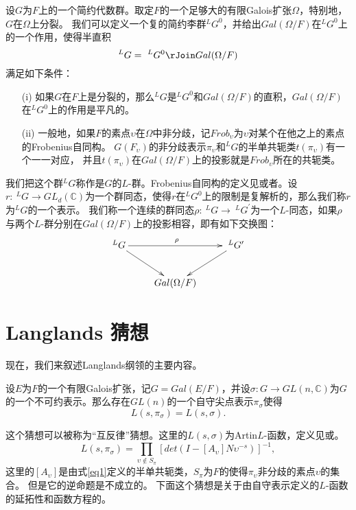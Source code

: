   设$G$为$F$上的一个简约代数群。取定$F$的一个足够大的有限Galois扩张$\Omega$，特别地，$G$在$\Omega$上分裂。
  我们可以定义一个复的简约李群$^LG^0$，并给出$Gal(\Omega/F)$在$^LG^0$上的一个作用，使得半直积
  $$^LG = \ ^LG^0\rJoin Gal(\Omega/F)$$
  满足如下条件：
  \begin{enumerate}
  \item[(i)]如果$G$在$F$上是分裂的，那么$^LG$是$^LG^0$和$Gal(\Omega/F)$的直积，$Gal(\Omega/F)$在$^LG^0$上的作用是平凡的。
  \item[(ii)]一般地，如果$F$的素点$\upsilon$在$\Omega$中非分歧，记$Frob_{\upsilon}$为$\upsilon$对某个在他之上的素点的Frobenius自同构。
  $G(F_{\upsilon})$的非分歧表示$\pi_{\upsilon}$和$^LG$的半单共轭类$t(\pi_{\upsilon})$有一个一一对应，
  并且$t(\pi_{\upsilon})$在$Gal(\Omega/F)$上的投影就是$Frob_{\upsilon}$所在的共轭类。
  \end{enumerate}

  我们把这个群$^LG$称作是$G$的$L$-群。Frobenius自同构的定义见或者。设$r:\ ^LG\rightarrow
  GL_d(\mathbb{C})$为一个群同态，使得$r$在$^LG^0$上的限制是复解析的，那么我们称$r$为$^LG$的一个表示。
  我们称一个连续的群同态$\rho:\ ^LG\rightarrow \
  ^LG^{\prime}$为一个$L$-同态，如果$\rho$与两个$L$-群分别在$Gal(\Omega/F)$上的投影相容，即有如下交换图：
  \[ \xymatrix{
  ^LG \ar[rr]^{\rho} \ar[dr] & & \ ^LG^{\prime} \ar[dl] \\
  & Gal(\Omega/F) & }  \]

\section{Langlands 猜想}
  现在，我们来叙述Langlands纲领的主要内容。
  \begin{conjecture}
  \label{cong1}
  设$E$为$F$的一个有限Galois扩张，记$G = Gal(E/F)$，并设$\sigma:
  G\rightarrow
  GL(n,\mathbb{C})$为$G$的一个不可约表示。那么存在$GL(n)$的一个自守尖点表示$\pi_{\sigma}$使得
  $$L(s,\pi_{\sigma}) = L(s,\sigma).$$
  \end{conjecture}

  这个猜想可以被称为“互反律”猜想。这里的$L(s,\sigma)$为Artin$L$-函数，定义见或。
  $$L(s,\pi_{\sigma}) = \prod\limits_{\upsilon\not\in S_{\pi}}[det(I-[A_{\upsilon}]N\upsilon^{-s})]^{-1},$$
  这里的$[A_{\upsilon}]$是由式\ref{eq1}定义的半单共轭类，$S_{\pi}$为$F$的使得$\pi_{\upsilon}$非分歧的素点$\upsilon$的集合。
  但是它的逆命题是不成立的\onlinecite{bump}。
  下面这个猜想是关于由自守表示定义的$L$-函数的延拓性和函数方程的。

